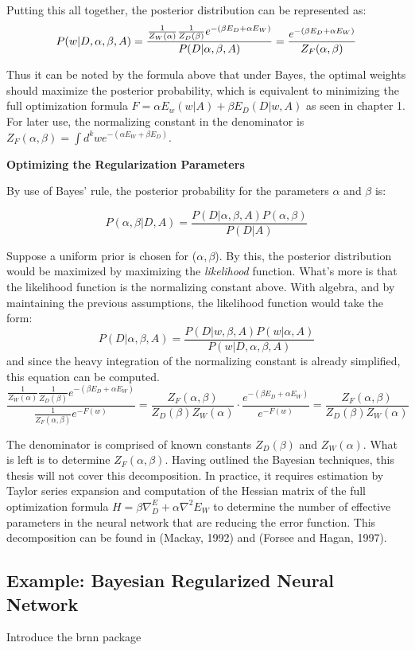 Putting this all together, the posterior distribution can be represented as:
$$
P(w|D,\alpha,\beta,A) = \frac{\frac{1}{Z_W(\alpha)} \frac{1}{Z_D(\beta)} e^{-(\beta E_D + \alpha E_W)}}{P(D|\alpha,\beta,A)} \\
= \frac{e^{-(\beta E_D + \alpha E_W)}}{Z_F(\alpha,\beta)}
$$

Thus it can be noted by the formula above that under Bayes, the optimal weights should maximize the posterior probability, which is equivalent to minimizing the full optimization formula $F = \alpha E_w(w|A) + \beta E_D(D|w,A)$ as seen in chapter 1.  For later use, the normalizing constant in the denominator is $Z_F(\alpha,\beta) = \int d^k w e^{-(\alpha E_W + \beta E_D)}$.


\textbf{Optimizing the Regularization Parameters}

By use of Bayes' rule, the posterior probability for the parameters $\alpha$ and $\beta$ is:

$$
P(\alpha, \beta | D,A) = \frac{P(D|\alpha,\beta,A) P(\alpha,\beta)}{P(D|A)}
$$



Suppose a uniform prior is chosen for ($\alpha,\beta$).  By this, the posterior distribution would be maximized by maximizing the \textit{likelihood} function.  What's more is that the likelihood function is the normalizing constant above.  With algebra, and by maintaining the previous assumptions, the likelihood function would take the form:
$$
P(D|\alpha,\beta,A) = \frac{P(D|w,\beta,A) P(w|\alpha,A)}{P(w|D,\alpha,\beta,A)}
$$
and since the heavy integration of the normalizing constant is already simplified, this equation can be computed.
$$
\frac{\frac{1}{Z_W(\alpha)} \frac{1}{Z_D(\beta)} e^{-(\beta E_D + \alpha E_W)}}{\frac{1}{Z_F(\alpha,\beta)} e^{-F(w)}} = \frac{Z_F(\alpha,\beta)}{Z_D(\beta) Z_W(\alpha)} \cdot \frac{e^{-(\beta E_D + \alpha E_W)}}{e^{-F(w)}} = \frac{Z_F(\alpha,\beta)}{Z_D(\beta) Z_W(\alpha)}
$$

The denominator is comprised of known constants $Z_D(\beta)$ and $Z_W(\alpha)$.  What is left is to determine $Z_F(\alpha,\beta)$.  Having outlined the Bayesian techniques, this thesis will not cover this decomposition.  In practice, it requires estimation by Taylor series expansion and computation of the Hessian matrix of the full optimization formula $H = \beta \nabla^ E_D + \alpha \nabla^2 E_W$ to determine the number of effective parameters in the neural network that are reducing the error function.  This decomposition can be found in (Mackay, 1992) and (Forsee and Hagan, 1997).


\begin{comment}
Through \textbf{margialization}, the true posterior $P(w|D,A)$ is obtained by integrating out $\alpha$ and $\beta$:
$$
P(w|D,A) = \int P(w|D,\alpha,\beta,A) P(\alpha, \beta | D,A) \text{ } d\alpha \text{ } d\beta
$$
\end{comment}

\subsection{Example: Bayesian Regularized Neural Network}

Introduce the brnn package

